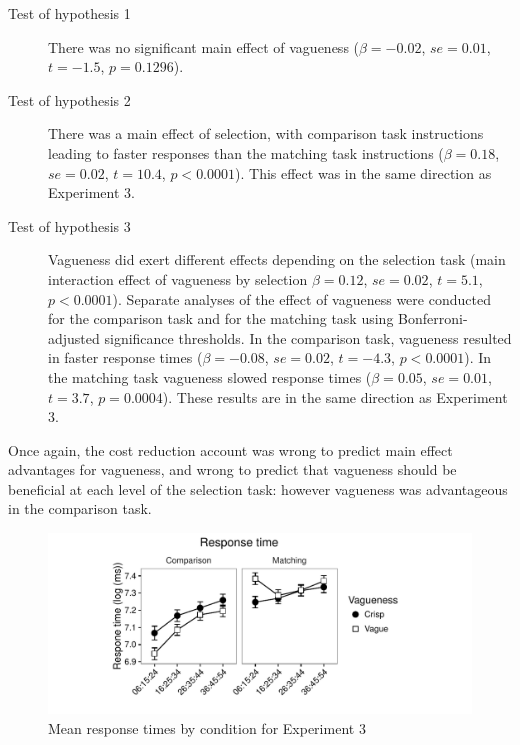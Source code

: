 \begin{description}
	\item [Test of hypothesis 1] There was no significant main effect of vagueness ($\beta=-0.02$, $se=0.01$, $t=-1.5$, $p=0.1296$). 
	\item [Test of hypothesis 2] There was a main effect of selection, with comparison task instructions leading to faster responses than the matching task instructions ($\beta=0.18$, $se=0.02$, $t=10.4$, $p<0.0001$).  This effect was in the same direction as Experiment 3. 
	\item [Test of hypothesis 3] Vagueness did exert different effects depending on the selection task (main interaction effect of vagueness by selection $\beta=0.12$, $se=0.02$, $t=5.1$, $p<0.0001$). 
Separate analyses of the effect of vagueness were conducted for the comparison task and for the matching task using Bonferroni-adjusted significance thresholds. 
In the comparison task, vagueness resulted in faster response times ($\beta=-0.08$, $se=0.02$, $t=-4.3$, $p<0.0001$). 
In the matching task vagueness slowed response times ($\beta=0.05$, $se=0.01$, $t=3.7$, $p=0.0004$). 
These results are in the same direction as Experiment 3.
\end{description}

Once again, the cost reduction account was wrong to predict main effect advantages for vagueness, and wrong to predict that vagueness should be beneficial at each level of the selection task: however vagueness was advantageous in the comparison task.

\begin{figure}[htbp]
\centering
\includegraphics[width=\textwidth]{figures/Ee3-rtplot-1.pdf}
\caption{Mean response times by condition for Experiment 3}
\label{resultsE-exp-3}
\end{figure}
